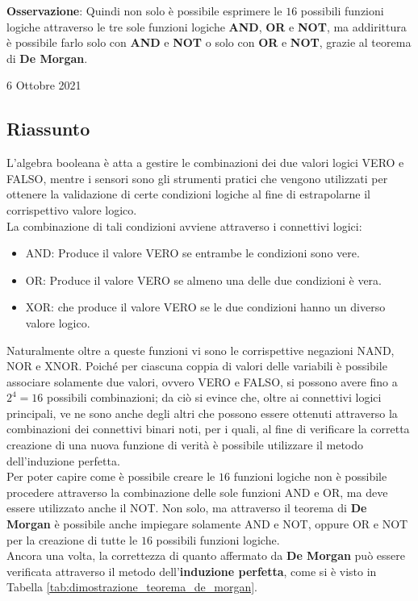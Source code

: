 \documentclass[a4paper]{extarticle}
\begin{document}
\noindent
\textbf{Osservazione}: Quindi non solo è possibile esprimere le \(16\) possibili funzioni logiche attraverso le tre sole funzioni logiche \textbf{AND}, \textbf{OR} e \textbf{NOT}, ma addirittura è possibile farlo solo con \textbf{AND} e \textbf{NOT} o solo con \textbf{OR} e \textbf{NOT}, grazie al teorema di \textbf{De Morgan}.

\newpage
\begin{center}
    6 Ottobre 2021
\end{center}

\subsection{Riassunto}
L'algebra booleana è atta a gestire le combinazioni dei due valori logici VERO e FALSO, mentre i sensori sono gli strumenti pratici che vengono utilizzati per ottenere la validazione di certe condizioni logiche al fine di estrapolarne il corrispettivo valore logico.\\
La combinazione di tali condizioni avviene attraverso i connettivi logici:
\begin{itemize}
    \item AND: Produce il valore VERO se entrambe le condizioni sono vere.
    \item OR: Produce il valore VERO se almeno una delle due condizioni è vera.
    \item XOR: che produce il valore VERO se le due condizioni hanno un diverso valore logico.
\end{itemize}
Naturalmente oltre a queste funzioni vi sono le corrispettive negazioni NAND, NOR e XNOR. Poiché per ciascuna coppia di valori delle variabili è possibile associare solamente due valori, ovvero VERO e FALSO, si possono avere fino a \(2^{4} = 16\) possibili combinazioni; da ciò si evince che, oltre ai connettivi logici principali, ve ne sono anche degli altri che possono essere ottenuti attraverso la combinazioni dei connettivi binari noti, per i quali, al fine di verificare la corretta creazione di una nuova funzione di verità è possibile utilizzare il metodo dell'induzione perfetta.\\
Per poter capire come è possibile creare le \(16\) funzioni logiche non è possibile procedere attraverso la combinazione delle sole funzioni AND e OR, ma deve essere utilizzato anche il NOT. Non solo, ma attraverso il teorema di \textbf{De Morgan} è possibile anche impiegare solamente AND e NOT, oppure OR e NOT per la creazione di tutte le \(16\) possibili funzioni logiche.\\
Ancora una volta, la correttezza di quanto affermato da \textbf{De Morgan} può essere verificata attraverso il metodo dell'\textbf{induzione perfetta}, come si è visto in Tabella \ref{tab:dimostrazione_teorema_de_morgan}.
\end{document}
